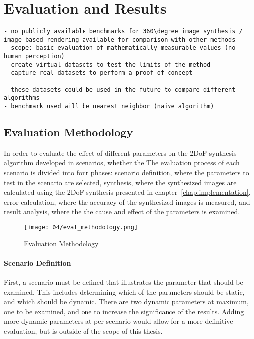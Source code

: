 \chapter{Evaluation and Results} \label{chap:evaluation}


\begin{verbatim}
- no publicly available benchmarks for 360\degree image synthesis / image based rendering available for comparison with other methods
- scope: basic evaluation of mathematically measurable values (no human perception)
- create virtual datasets to test the limits of the method
- capture real datasets to perform a proof of concept

- these datasets could be used in the future to compare different algorithms
- benchmark used will be nearest neighbor (naive algorithm)
\end{verbatim}

\section{Evaluation Methodology}
In order to evaluate the effect of different parameters on the 2DoF synthesis algorithm developed in \ar scenarios, whether the
The evaluation process of each scenario is divided into four phases: scenario definition, where the parameters to test in the scenario are selected, synthesis, where the synthesized images are calculated using the 2DoF synthesis presented in chapter~\ref{chap:implementation}, error calculation, where the accuracy of the synthesized images is measured, and result analysis, where the the cause and effect of the parameters is examined. 

\begin{figure}
		\centering
		\texttt{[image: 04/eval\_methodology.png]}
		\caption{Evaluation Methodology}
		\label{fig:eval-methodology}
\end{figure}

\subsubsection{Scenario Definition}
First, a scenario must be defined that illustrates the parameter that should be examined. This includes determining which of the parameters should be static, and which should be dynamic. There are two dynamic parameters at maximum, one to be examined, and one to increase the significance of the results. Adding more dynamic parameters at per scenario would allow for a more definitive evaluation, but is outside of the scope of this thesis.

